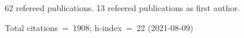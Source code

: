 62 refereed publications. 13 refeered publications as first author.

Total citations~=~1908; h-index~=~22 (2021-08-09)